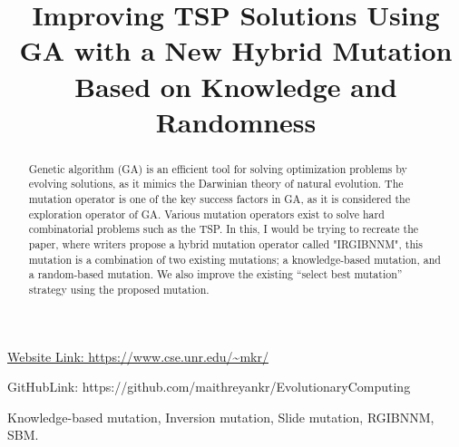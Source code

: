 \documentclass[conference]{IEEEtran}
\begin{document}
\title{Improving TSP Solutions Using GA with a New Hybrid Mutation Based on Knowledge and Randomness}


\author{
\and
{}
\and
{}

}

\maketitle

\url{Website Link: https://www.cse.unr.edu/~mkr/} 

{\small{GitHubLink:  https://github.com/maithreyankr/EvolutionaryComputing}}

\bigskip

\begin{abstract}


Genetic algorithm (GA) is an efficient tool for solving optimization problems by evolving
solutions, as it mimics the Darwinian theory of natural evolution. The mutation operator is one
of the key success factors in GA, as it is considered the exploration operator of GA.
Various mutation operators exist to solve hard combinatorial problems such as the TSP. In this, I would be trying to recreate the paper, where writers propose a hybrid mutation operator called "IRGIBNNM", this mutation is a
combination of two existing mutations; a knowledge-based mutation, and a random-based
mutation. We also improve the existing “select best mutation” strategy using the proposed
mutation.

\end{abstract}

\begin{IEEEkeywords}
Knowledge-based mutation, Inversion mutation, Slide mutation,
RGIBNNM, SBM.
\end{IEEEkeywords}
\end{document}
